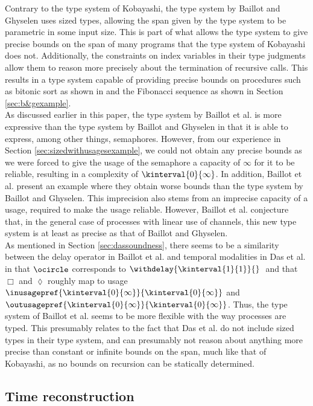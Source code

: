 Contrary to the type system of Kobayashi, the type system by Baillot and Ghyselen uses sized types, allowing the span given by the type system to be parametric in some input size. This is part of what allows the type system to give precise bounds on the span of many programs that the type system of Kobayashi does not. Additionally, the constraints on index variables in their type judgments allow them to reason more precisely about the termination of recursive calls. This results in a type system capable of providing precise bounds on procedures such as bitonic sort as shown in \cite{BaillotGhyselen2021} and the Fibonacci sequence as shown in Section \ref{sec:b&gexample}.\\

As discussed earlier in this paper, the type system by Baillot et al. is more expressive than the type system by Baillot and Ghyselen in that it is able to express, among other things, semaphores. However, from our experience in Section \ref{sec:sizedwithusagesexample}, we could not obtain any precise bounds as we were forced to give the usage of the semaphore a capacity of $\infty$ for it to be reliable, resulting in a complexity of $\kinterval{0}{\infty}$. In addition, Baillot et al. present an example where they obtain worse bounds than the type system by Baillot and Ghyselen. This imprecision also stems from an imprecise capacity of a usage, required to make the usage reliable. However, Baillot et al. conjecture that, in the general case of processes with linear use of channels, this new type system is at least as precise as that of Baillot and Ghyselen.\\

As mentioned in Section \ref{sec:dassoundness}, there seems to be a similarity between the delay operator in Baillot et al. and temporal modalities in Das et al. in that $\ocircle$ corresponds to $\withdelay{\kinterval{1}{1}}{}\;$ and that $\Box$ and $\lozenge$ roughly map to usage $\inusagepref{\kinterval{0}{\infty}}{\kinterval{0}{\infty}}$ and $\outusagepref{\kinterval{0}{\infty}}{\kinterval{0}{\infty}}$. Thus, the type system of Baillot et al. seems to be more flexible with the way processes are typed. This presumably relates to the fact that Das et al. do not include sized types in their type system, and can presumably not reason about anything more precise than constant or infinite bounds on the span, much like that of Kobayashi, as no bounds on recursion can be statically determined. %

\subsection{Time reconstruction}\label{sec:inference}

